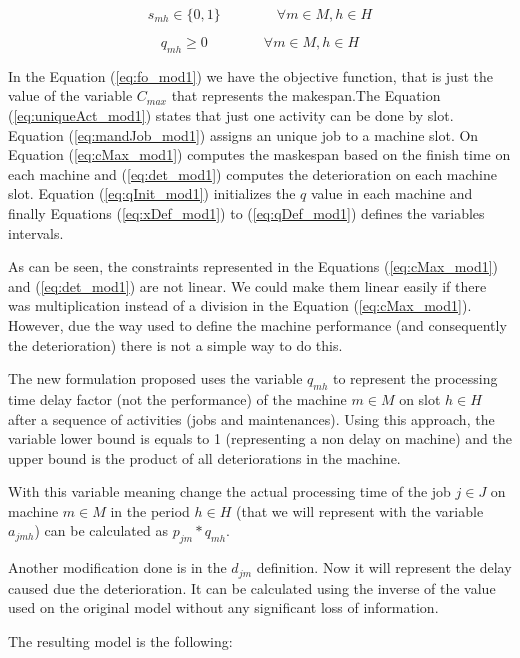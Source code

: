 \documentclass[a4paper,11pt]{article}
\begin{document}
\begin{equation}\label{eq:dDef_mod1}
    s_{mh} \in \{0,1\} \quad \quad \quad \quad \forall m \in M, h \in H
\end{equation}

\begin{equation}\label{eq:qDef_mod1}
    q_{mh} \geq 0 \quad \quad \quad \quad \forall  m \in M, h \in H
\end{equation}

In the Equation (\ref{eq:fo_mod1}) we have the objective function, that is just the value of the variable $C_{max}$ that represents the makespan.The Equation (\ref{eq:uniqueAct_mod1}) states that just one activity can be done by slot. Equation (\ref{eq:mandJob_mod1}) assigns an unique job to a machine slot. On Equation  (\ref{eq:cMax_mod1}) computes the maskespan based on the finish time on each machine and (\ref{eq:det_mod1}) computes the deterioration on each machine slot. Equation (\ref{eq:qInit_mod1}) initializes the $q$ value in each machine and finally Equations (\ref{eq:xDef_mod1}) to (\ref{eq:qDef_mod1}) defines the variables intervals. 

As can be seen, the constraints represented in the Equations (\ref{eq:cMax_mod1}) and (\ref{eq:det_mod1}) are not linear. We could make them linear easily if there was multiplication instead of a division in the Equation (\ref{eq:cMax_mod1}). However, due the way used to define the machine performance (and consequently the deterioration) there is not a simple way to do this.

The new formulation proposed uses the variable $q_{mh}$ to represent the processing time delay factor (not the performance) of the machine $m \in M$ on slot $h \in H$ after a sequence of activities (jobs and maintenances). Using this approach, the variable lower bound is equals to 1 (representing a non delay on machine) and the upper bound is the product of all deteriorations in the machine. 

With this variable meaning change the actual processing time of the job $j \in J$ on machine $m \in M$ in the period $h \in H$ (that we will represent with the variable $a_{jmh}$) can be calculated as $p_{jm}*q_{mh}$. 

Another modification done is in the $d_{jm}$ definition. Now it will represent the delay caused due the deterioration. It can be calculated using the inverse of the value used on the original model without any significant loss of information.   

The resulting model is the following: 
\end{document}
